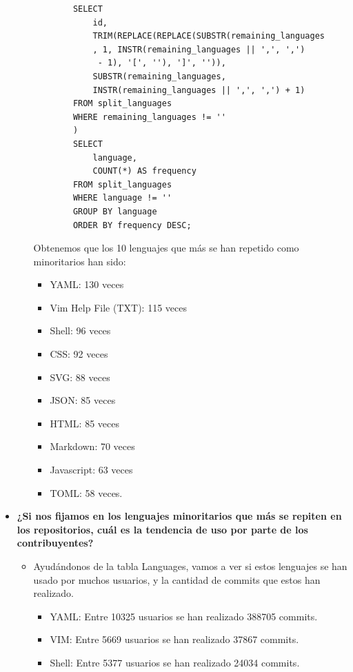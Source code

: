 \documentclass[a4paper, 12pt]{book}
\begin{document}
\begin{itemize}
\begin{itemize}
\begin{verbatim}
        SELECT 
            id,
            TRIM(REPLACE(REPLACE(SUBSTR(remaining_languages
            , 1, INSTR(remaining_languages || ',', ',')
             - 1), '[', ''), ']', '')),
            SUBSTR(remaining_languages, 
            INSTR(remaining_languages || ',', ',') + 1)
        FROM split_languages
        WHERE remaining_languages != ''
        )
        SELECT 
            language, 
            COUNT(*) AS frequency
        FROM split_languages
        WHERE language != ''
        GROUP BY language
        ORDER BY frequency DESC;
      \end{verbatim}
                Obtenemos que los 10 lenguajes que más se han repetido como minoritarios han sido: 
                \begin{itemize}
                  \item YAML: 130 veces
                  \item Vim Help File (TXT): 115 veces
                  \item Shell: 96 veces
                  \item CSS: 92 veces
                  \item SVG: 88 veces
                  \item JSON: 85 veces
                  \item HTML: 85 veces
                  \item Markdown: 70 veces
                  \item Javascript: 63 veces
                  \item TOML: 58 veces.
                \end{itemize}
        \end{itemize}
  \item \textbf{¿Si nos fijamos en los lenguajes minoritarios que más se repiten en los repositorios, cuál es la tendencia de uso por parte de los contribuyentes?}
        \begin{itemize}
          \item Ayudándonos de la tabla Languages, vamos a ver si estos lenguajes se han usado por muchos usuarios, y la cantidad de commits que estos han realizado.
                \begin{itemize}
                  \item YAML: Entre 10325 usuarios se han realizado 388705 commits.
                  \item VIM: Entre 5669 usuarios se han realizado 37867 commits.
                  \item Shell: Entre 5377 usuarios se han realizado 24034 commits.

\end{itemize}
\end{itemize}
\end{itemize}
\end{document}
